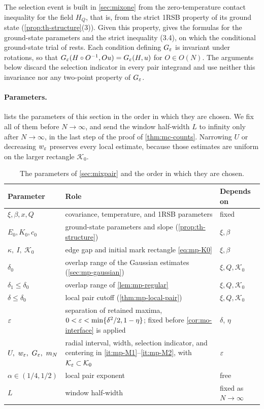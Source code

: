 The selection event is built in \cref{sec:mixone} from the zero-temperature contact inequality for the field $H_Q$, that is, from the strict 1RSB property of its ground state (\cref{prop:th-structure}(3)). Given this property, \cite[Lemma~3.5]{HuangSellke2024} gives the formulas for the ground-state parameters and the strict inequality (3.4), on which the conditional ground-state trial of \cite[Lemma~3.11 and Proposition~3.13]{HuangSellke2024} rests.
Each condition defining $G_\varepsilon$ is invariant under rotations, so that $G_\varepsilon(H\circ O^{-1},Ou)=G_\varepsilon(H,u)$ for $O\in O(N)$. The arguments below discard the selection indicator in every pair integrand and use neither this invariance nor any two-point property of $G_\varepsilon$.

\paragraph{Parameters.}
 lists the parameters of this section in the order in which they are chosen. We fix all of them before $N\to\infty$, and send the window half-width $L$ to infinity only after $N\to\infty$, in the last step of the proof of \cref{thm:mc-counts}. Narrowing $U$ or decreasing $w_\varepsilon$ preserves every local estimate, because those estimates are uniform on the larger rectangle $\mathcal K_0$.

\begin{table}[ht]
\centering\small
\begin{tabular}{@{}p{}p{}p{}@{}}
\toprule
Parameter & Role & Depends on\\
\midrule
$\xi,\beta,x,Q$ & covariance, temperature, and 1RSB parameters & fixed\\
$E_0,K_0,c_0$ & ground-state parameters and slope (\cref{prop:th-structure}) & $\xi,\beta$\\
$\kappa,\ I,\ \mathcal K_0$ & edge gap and initial mark rectangle \eqref{eq:mp-K0} & $\xi,\beta$\\
$\delta_0$ & overlap range of the Gaussian estimates (\cref{sec:mp-gaussian}) & $\xi,Q,\mathcal K_0$\\
$\delta_1\le\delta_0$ & overlap range of \cref{lem:mp-regular} & $\xi,Q,\mathcal K_0$\\
$\delta\le\delta_0$ & local pair cutoff (\cref{thm:mp-local-pair}) & $\xi,Q,\mathcal K_0$\\
$\varepsilon$ & separation of retained maxima, $0<\varepsilon<\min\{\delta^2/2,1-\eta\}$; fixed before \cref{cor:mo-interface} is applied & $\delta$, $\eta$\\
$U,\ w_\eps,\ G_\eps,\ m_N$ & radial interval, width, selection indicator, and centering in \ref{it:mp-M1}--\ref{it:mp-M2}, with $\mathcal K_\varepsilon\subset\mathcal K_0$ & $\varepsilon$\\
$\alpha\in(1/4,1/2)$ & local pair exponent & free\\
$L$ & window half-width & fixed as $N\to\infty$\\
\bottomrule
\end{tabular}
\caption{The parameters of \cref{sec:mixpair} and the order in which they are chosen.}\label{tab:mp-parameters}
\end{table}


